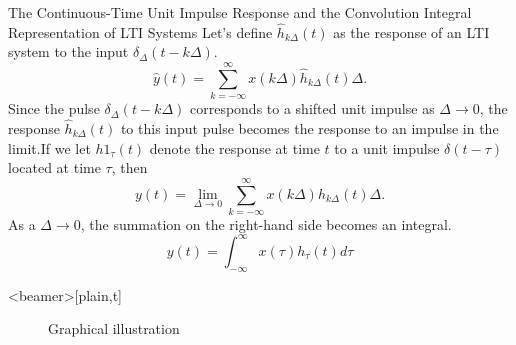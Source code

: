 \begin{frame}{The Continuous-Time Unit Impulse Response and the Convolution Integral Representation of LTI Systems}
    Let's  define $\hat{h}_{k\Delta}(t)$ as the response of an LTI system to the input $\delta_\Delta(t- k\Delta)$.
    \begin{equation*}
        \hat{y}(t) =  \sum_{k=-\infty}^{\infty} x(k\Delta)\hat{h}_{k\Delta}(t)\Delta.
    \end{equation*}
    Since the pulse $\delta_\Delta(t - k\Delta)$ corresponds to a shifted unit impulse as $\Delta \rightarrow 0$, the response $\hat{h}_{k\Delta}(t)$ to this input pulse becomes the response to an impulse in the limit.If we let $h1_\tau(t)$ denote the response at time $t$ to a unit impulse $\delta(t - \tau)$ located at time $\tau$, then
    \begin{equation*}
        {y}(t) =  \lim_{\Delta \rightarrow 0} \sum_{k=-\infty}^{\infty} x(k\Delta){h}_{k\Delta}(t)\Delta.
    \end{equation*}
    As a $\Delta \rightarrow 0$, the summation on the right-hand side becomes an integral.
    \begin{equation*}
        y(t) = \int_{-\infty}^{\infty} x(\tau)h_\tau(t)d\tau
    \end{equation*}
    \pause
    {
    }

\end{frame}


\begin{frame}<beamer>[plain,t]
    {
    \begin{figure}
      \centering
      
      \caption{Graphical illustration}\label{fi:conv_integral}
    \end{figure}
    }
\end{frame}

